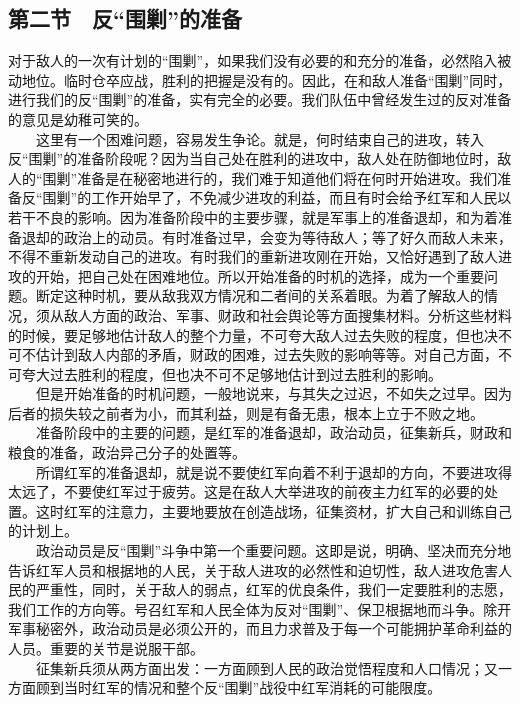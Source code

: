 \documentclass[cn,11pt,chinese]{elegantbook}
\def\myformat#1{\hfil\hfil #1}
\begin{document}
\subsection*{\myformat{第二节　反“围剿”的准备}}
对于敌人的一次有计划的“围剿”，如果我们没有必要的和充分的准备，必然陷入被动地位。临时仓卒应战，胜利的把握是没有的。因此，在和敌人准备“围剿”同时，进行我们的反“围剿”的准备，实有完全的必要。我们队伍中曾经发生过的反对准备的意见是幼稚可笑的。\\
　　这里有一个困难问题，容易发生争论。就是，何时结束自己的进攻，转入反“围剿”的准备阶段呢？因为当自己处在胜利的进攻中，敌人处在防御地位时，敌人的“围剿”准备是在秘密地进行的，我们难于知道他们将在何时开始进攻。我们准备反“围剿”的工作开始早了，不免减少进攻的利益，而且有时会给予红军和人民以若干不良的影响。因为准备阶段中的主要步骤，就是军事上的准备退却，和为着准备退却的政治上的动员。有时准备过早，会变为等待敌人；等了好久而敌人未来，不得不重新发动自己的进攻。有时我们的重新进攻刚在开始，又恰好遇到了敌人进攻的开始，把自己处在困难地位。所以开始准备的时机的选择，成为一个重要问题。断定这种时机，要从敌我双方情况和二者间的关系着眼。为着了解敌人的情况，须从敌人方面的政治、军事、财政和社会舆论等方面搜集材料。分析这些材料的时候，要足够地估计敌人的整个力量，不可夸大敌人过去失败的程度，但也决不可不估计到敌人内部的矛盾，财政的困难，过去失败的影响等等。对自己方面，不可夸大过去胜利的程度，但也决不可不足够地估计到过去胜利的影响。\\
　　但是开始准备的时机问题，一般地说来，与其失之过迟，不如失之过早。因为后者的损失较之前者为小，而其利益，则是有备无患，根本上立于不败之地。\\
　　准备阶段中的主要的问题，是红军的准备退却，政治动员，征集新兵，财政和粮食的准备，政治异己分子的处置等。\\
　　所谓红军的准备退却，就是说不要使红军向着不利于退却的方向，不要进攻得太远了，不要使红军过于疲劳。这是在敌人大举进攻的前夜主力红军的必要的处置。这时红军的注意力，主要地要放在创造战场，征集资材，扩大自己和训练自己的计划上。\\
　　政治动员是反“围剿”斗争中第一个重要问题。这即是说，明确、坚决而充分地告诉红军人员和根据地的人民，关于敌人进攻的必然性和迫切性，敌人进攻危害人民的严重性，同时，关于敌人的弱点，红军的优良条件，我们一定要胜利的志愿，我们工作的方向等。号召红军和人民全体为反对“围剿”、保卫根据地而斗争。除开军事秘密外，政治动员是必须公开的，而且力求普及于每一个可能拥护革命利益的人员。重要的关节是说服干部。\\
　　征集新兵须从两方面出发：一方面顾到人民的政治觉悟程度和人口情况；又一方面顾到当时红军的情况和整个反“围剿”战役中红军消耗的可能限度。\\
\end{document}
